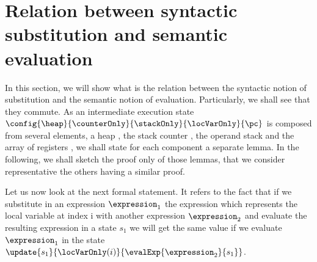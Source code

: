 \newtheorem{substHeap}{Lemma}[section]
\newtheorem{newHeap}[substHeap]{Lemma}
\newtheorem{substStack}[substHeap]{Lemma}
\newtheorem{substCntr}[substHeap]{Lemma}
\newtheorem{substLv}[substHeap]{Lemma}
\newtheorem{substRet}[substHeap]{Lemma}


\newtheorem{valid}{Definition}[section]

\section{Relation between syntactic substitution and semantic evaluation}\label{substProp}

In this section, we will show what is the relation between the syntactic notion
of substitution and the semantic notion of evaluation. Particularly, we shall see that they commute.
As an intermediate execution state $ \config{\heap}{\counterOnly}{ \stackOnly }{\locVarOnly}{\pc } $ 
is composed from several elements, a heap \heap{}, the stack counter \counterOnly, the operand stack \stackOnly{} 
and the array of registers \locVarOnly, we shall state for each component a separate lemma.
In the following, we shall sketch the proof only of those lemmas, that we consider representative  the others having a similar proof. 

Let us now look at the next formal statement.
It refers to the fact that if we substitute in an expression $\expression_1$ 
the expression   which represents the local variable at index i
 with another expression $\expression_2$ and evaluate the resulting expression in a state $s_1$
 we will get the same value if we evaluate   $\expression_1$  in the state 
$\update{s_1}{\locVarOnly(i) }{ \evalExp{ \expression_2 }{s_1}  }$.


